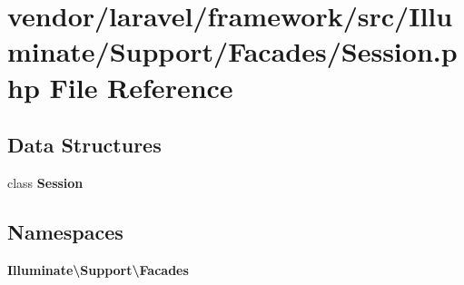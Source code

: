 \section{vendor/laravel/framework/src/\+Illuminate/\+Support/\+Facades/\+Session.php File Reference}
\label{vendor_2laravel_2framework_2src_2_illuminate_2_support_2_facades_2session_8php}
\subsection*{Data Structures}
\begin{DoxyCompactItemize}
\item 
class {\bf Session}
\end{DoxyCompactItemize}
\subsection*{Namespaces}
\begin{DoxyCompactItemize}
\item 
 {\bf Illuminate\textbackslash{}\+Support\textbackslash{}\+Facades}
\end{DoxyCompactItemize}
